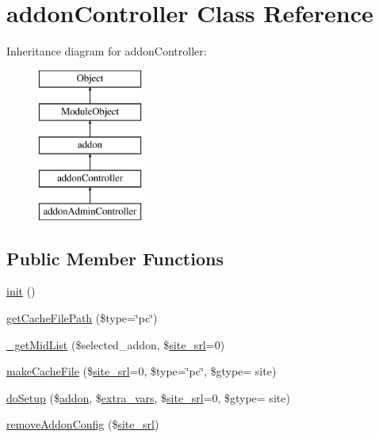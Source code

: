 \hypertarget{classaddonController}{}\section{addon\+Controller Class Reference}
\label{classaddonController}
Inheritance diagram for addon\+Controller\+:\begin{figure}[H]
\begin{center}
\leavevmode
\includegraphics[height=5.000000cm]{classaddonController}
\end{center}
\end{figure}
\subsection*{Public Member Functions}
\begin{DoxyCompactItemize}
\item 
\hyperlink{classaddonController_a11ede7aecba420c2a5c7e55d8bab4013}{init} ()
\item 
\hyperlink{classaddonController_aaad3343ec8471cab540db6ebde4c06bd}{get\+Cache\+File\+Path} (\$type=\char`\"{}pc\char`\"{})
\item 
\hyperlink{classaddonController_a7a1ed742a1dd2c4f71e56acafe31c13d}{\+\_\+get\+Mid\+List} (\$selected\+\_\+addon, \$\hyperlink{ko_8install_8php_a8b1406b4ad1048041558dce6bfe89004}{site\+\_\+srl}=0)
\item 
\hyperlink{classaddonController_ad0f567db4f461bb5d2d6449b38f261ed}{make\+Cache\+File} (\$\hyperlink{ko_8install_8php_a8b1406b4ad1048041558dce6bfe89004}{site\+\_\+srl}=0, \$type=\char`\"{}pc\char`\"{}, \$gtype= \textquotesingle{}site\textquotesingle{})
\item 
\hyperlink{classaddonController_a029f47b2dc77ada00e12e6323039ebdb}{do\+Setup} (\$\hyperlink{classaddon}{addon}, \$\hyperlink{ko_8install_8php_ae1dcb37fc34a8f312d2e6abd6f806743}{extra\+\_\+vars}, \$\hyperlink{ko_8install_8php_a8b1406b4ad1048041558dce6bfe89004}{site\+\_\+srl}=0, \$gtype= \textquotesingle{}site\textquotesingle{})
\item 
\hyperlink{classaddonController_ad90c76bfd8351152d3d69b287c606fe5}{remove\+Addon\+Config} (\$\hyperlink{ko_8install_8php_a8b1406b4ad1048041558dce6bfe89004}{site\+\_\+srl})
\end{DoxyCompactItemize}
